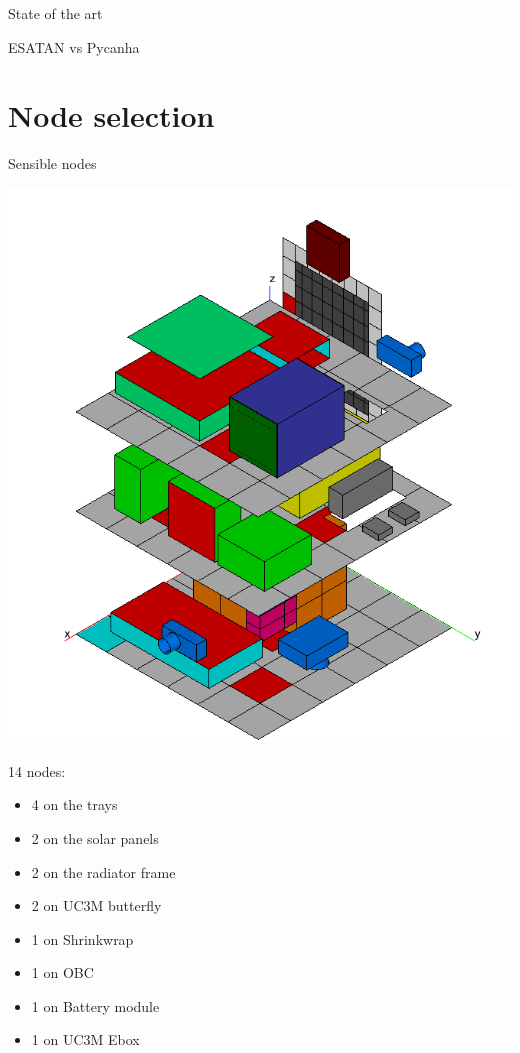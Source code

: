 \documentclass{cubeamer}
\begin{document}
\begin{frame}{State of the art}
\begin{minipage}{0.65\textwidth}
\begin{frame}{ESATAN vs Pycanha}
\section{Node selection}
\begin{frame}{Sensible nodes}
\begin{center}

    \begin{minipage}{0.45\textwidth}
    \includegraphics[width=0.9\linewidth]{Figures/nodos1.png}
\end{minipage}
\begin{minipage}{0.5\textwidth}
14 nodes:
    \begin{itemize}
        \item 4 on the trays
        \item 2 on the solar panels
        \item 2 on the radiator frame
        \item 2 on UC3M butterfly 
        \item 1 on Shrinkwrap
        \item 1 on OBC
        \item 1 on Battery module
        \item 1 on UC3M Ebox
    \end{itemize}
\end{minipage}
\end{center}


\end{frame}
\end{frame}
\end{minipage}
\end{frame}
\end{document}
